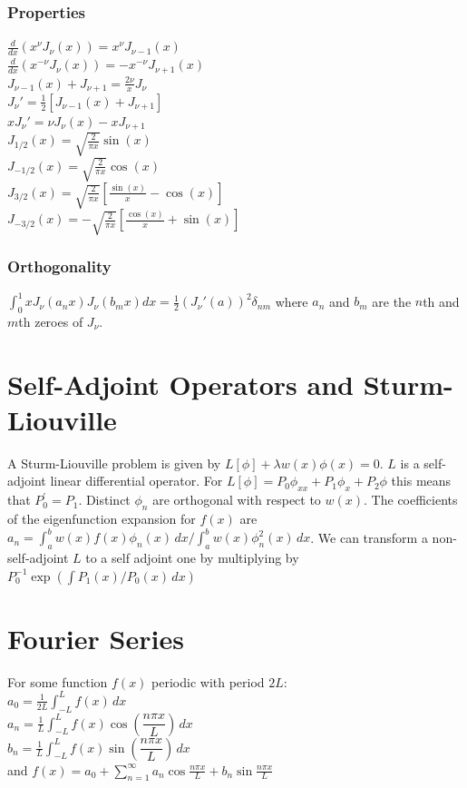 \documentclass[10pt,landscape,letterpaper]{cheatsheet}
\begin{document}
\subsubsection{Properties}
$\frac{d}{dx}(x^\nu J_\nu(x))=x^\nu J_{\nu-1}(x)$\\
$\frac{d}{dx}(x^{-\nu} J_\nu(x))=-x^{-\nu} J_{\nu+1}(x)$\\
$J_{\nu-1}(x)+J_{\nu+1}=\frac{2\nu}{x}J_\nu$\\
$J_{\nu}'=\frac{1}{2}\left[J_{\nu-1}(x)+J_{\nu+1}\right]$\\
$xJ_{\nu}'=\nu J_{\nu}(x)-xJ_{\nu+1}$\\
$J_{1/2}(x)=\sqrt{\frac{2}{\pi x}}\sin(x)$\\
$J_{-1/2}(x)=\sqrt{\frac{2}{\pi x}}\cos(x)$\\
$J_{3/2}(x)=\sqrt{\frac{2}{\pi x}}\left[\frac{\sin(x)}{x}-\cos(x)\right]$\\
$J_{-3/2}(x)=-\sqrt{\frac{2}{\pi x}}\left[\frac{\cos(x)}{x}+\sin(x)\right]$
\subsubsection{Orthogonality}
$\int_0^1xJ_\nu(a_nx)J_\nu(b_mx)dx=\frac{1}{2}(J_\nu'(a))^2\delta_{nm}$
where $a_n$ and $b_m$ are the $n$th and $m$th zeroes of $J_\nu$.
\section{Self-Adjoint Operators and Sturm-Liouville}
A Sturm-Liouville problem is given by 
$L\left[\phi\right]+\lambda w(x)\phi(x)=0$. 
$L$ is a self-adjoint linear differential operator. For 
$L[\phi]=P_0\phi_{xx}+P_1\phi_x+P_2\phi$ this means that 
$P_0^\prime=P_1$. Distinct $\phi_n$ are orthogonal with respect to $w(x)$.
The coefficients of the eigenfunction expansion for $f(x)$ are 
$a_n=\int_a^bw(x)f(x)\phi_n(x)\,dx/\int_a^bw(x)\phi_n^2(x)\,dx$. We can transform a 
non-self-adjoint $L$ to a self adjoint one by multiplying by 
$P_0^{-1}\exp(\int P_1(x)/P_0(x)\,dx)$
\section*{Fourier Series}
For some function $f(x)$ periodic with period $2L$:\\
$a_0=\frac{1}{2L}\int_{-L}^{L}f(x)\,dx$\\
$a_n=\frac{1}{L}\int_{-L}^{L}f(x)\cos\left(\dfrac{n\pi x}{L}\right)\,dx$\\
$b_n=\frac{1}{L}\int_{-L}^{L}f(x)\sin\left(\dfrac{n\pi x}{L}\right)\,dx$\\
and
$f(x)=a_0+\sum_{n=1}^{\infty}a_n\cos\frac{n\pi x}{L}+b_n\sin\frac{n\pi x}{L}$
\end{document}
